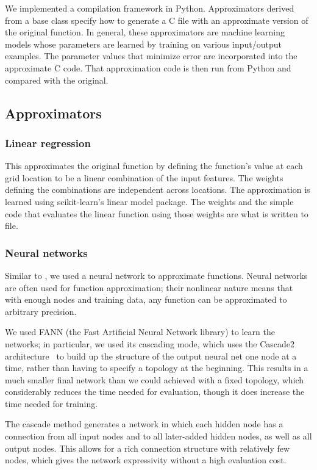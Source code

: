 \documentclass{article}
\begin{document}
We implemented a compilation framework in Python. Approximators derived from a base class specify how to generate a C file with an approximate version of the original function. In general, these approximators are machine learning models whose parameters are learned by training on various input/output examples. The parameter values that minimize error are incorporated into the approximate C code. That approximation code is then run from Python and compared with the original.

\subsection{Approximators}

\subsubsection{Linear regression}

This approximates the original function by defining the function's value at each grid location to be a linear combination of the input features. The weights defining the combinations are independent across locations. The approximation is learned using scikit-learn's linear model package. The weights and the simple code that evaluates the linear function using those weights are what is written to file.

\subsubsection{Neural networks}

Similar to \cite{Esmaeilzadeh12}, we used a neural network to approximate functions. Neural networks are often used for function approximation; their nonlinear nature means that with enough nodes and training data, any function can be approximated to arbitrary precision.

We used FANN (the Fast Artificial Neural Network library) to learn the networks; in particular, we used its cascading mode, which uses the Cascade2 architecture~\cite{fahlman} to build up the structure of the output neural net one node at a time, rather than having to specify a topology at the beginning. This results in a much smaller final network than we could achieved with a fixed topology, which considerably reduces the time needed for evaluation, though it does increase the time needed for training.

The cascade method generates a network in which each hidden node has a connection from all input nodes and to all later-added hidden nodes, as well as all output nodes. This allows for a rich connection structure with relatively few nodes, which gives the network expressivity without a high evaluation cost.
\end{document}
